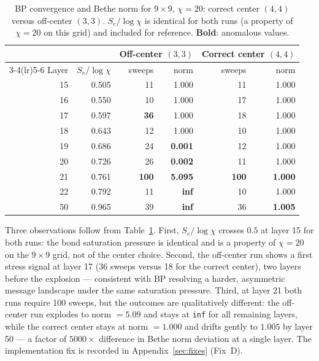 \begin{table}[ht]
\centering
\caption{BP convergence and Bethe norm for $9\times9$, $\chi=20$: correct
 center $(4,4)$ versus off-center $(3,3)$.
 $S_e/\log\chi$ is identical for both runs (a property of $\chi=20$ on
 this grid) and included for reference.
 \textbf{Bold}: anomalous values.}
\label{tab:center_compare}
\small
\begin{tabular}{r r rr rr}
\toprule
 & & \multicolumn{2}{c}{Off-center $(3,3)$} & \multicolumn{2}{c}{Correct center $(4,4)$} \\
\cmidrule(lr){3-4}\cmidrule(lr){5-6}
Layer & $S_e/\log\chi$ & sweeps & norm & sweeps & norm \\
\midrule
15 & 0.505 & 11 & 1.000 & 11 & 1.000 \\
16 & 0.550 & 10 & 1.000 & 17 & 1.000 \\
17 & 0.597 & \textbf{36} & 1.000 & 18 & 1.000 \\
18 & 0.643 & 12 & 1.000 & 10 & 1.000 \\
19 & 0.686 & 24 & \textbf{0.001} & 12 & 1.000 \\
20 & 0.726 & 26 & \textbf{0.002} & 11 & 1.000 \\
21 & 0.761 & \textbf{100} & \textbf{5.095} & \textbf{100} & \textbf{1.000} \\
22 & 0.792 & 11 & \textbf{inf} & 10 & 1.000 \\
50 & 0.965 & 39 & \textbf{inf} & 36 & \textbf{1.005} \\
\bottomrule
\end{tabular}
\end{table}

Three observations follow from Table~\ref{tab:center_compare}.
First, $S_e/\log\chi$ crosses $0.5$ at layer 15 for both runs: the bond
saturation pressure is identical and is a property of $\chi=20$ on the
$9\times9$ grid, not of the center choice.
Second, the off-center run shows a first stress signal at layer 17
(36 sweeps versus 18 for the correct center), two layers before the
explosion — consistent with BP resolving a harder, asymmetric message
landscape under the same saturation pressure.
Third, at layer 21 both runs require 100 sweeps, but the outcomes are
qualitatively different: the off-center run explodes to norm $= 5.09$
and stays at \texttt{inf} for all remaining layers, while the correct
center stays at norm $= 1.000$ and drifts gently to $1.005$ by layer 50
--- a factor of $5000\times$ difference in Bethe norm deviation at a
single layer.
The implementation fix is recorded in Appendix~\ref{sec:fixes} (Fix~D).

